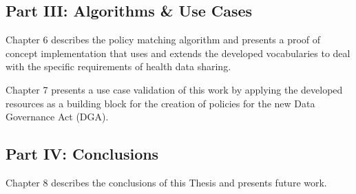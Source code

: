 \subsection*{Part III: Algorithms \& Use Cases}

Chapter 6 describes the policy matching algorithm and presents a proof of concept implementation that uses and extends the developed vocabularies to deal with the specific requirements of health data sharing.


Chapter 7 presents a use case validation of this work by applying the developed resources as a building block for the creation of policies for the new Data Governance Act (DGA).

\subsection*{Part IV: Conclusions}

Chapter 8 describes the conclusions of this Thesis and presents future work.